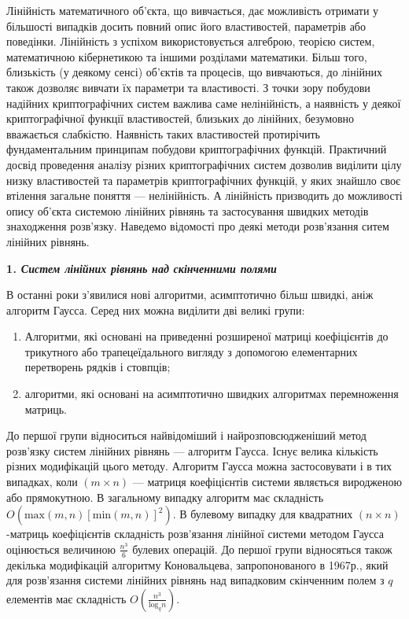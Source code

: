 \bigskip


\bigskip

Лінійність математичного об’єкта, що вивчається, дає можливість отримати у
більшості випадків досить повний опис його властивостей, параметрів або
поведінки. Лінійність з успіхом використовується алгеброю, теорією систем,
математичною кібернетикою та іншими розділами математики. Більш того,
близькість (у деякому сенсі)  об’єктів та процесів, що вивчаються, до лінійних
також дозволяє вивчати їх параметри та властивості. З точки зору побудови
надійних криптографічних систем важлива саме нелінійність, а наявність у деякої
криптографічної функції властивостей, близьких до лінійних, безумовно
вважається слабкістю. Наявність таких властивостей протирічить фундаментальним
принципам побудови криптографічних функцій. Практичний досвід проведення
аналізу різних криптографічних систем дозволив виділити цілу низку властивостей
та параметрів криптографічних функцій, у яких знайшло своє втілення загальне
поняття --- нелінійність. А лінійність призводить до можливості опису об’єкта
системою лінійних рівнянь та застосування швидких методів знаходження
розв’язку. Наведемо відомості про деякі методи розв’язання ситем лінійних
рівнянь.


\bigskip

{\bfseries
1\textit{. Систем лінійних рівнянь над скінченними полями}}

 В останні роки з’явилися нові алгоритми, асимптотично більш швидкі, аніж
алгоритм Гаусса. Серед них можна виділити дві великі групи:

\liststyleWWviiiNumxxiii
\begin{enumerate}
\item Алгоритми, які основані на приведенні розширеної матриці коефіцієнтів до
трикутного або трапецеїдального вигляду з допомогою елементарних перетворень
рядків і стовпців;
\item алгоритми, які основані на асимптотично швидких алгоритмах перемноження
матриць.
\end{enumerate}
До першої групи відноситься найвідоміший і найрозповсюдженіший метод розв’язку
систем лінійних рівнянь --- алгоритм Гаусса. Існує велика кількість різних
модифікацій цього методу. Алгоритм Гаусса можна застосовувати і в тих випадках,
коли  ${(m\times n)}$ --- матриця коефіцієнтів системи являється виродженою або
прямокутною. В загальному випадку алгоритм має складність 
${O(\text{max}(m,n)[\text{min}(m,n)]^{{2}})}$. В булевому випадку для
квадратних  ${(n\times n)}${}-матриць коефіцієнтів складність розв’язання
лінійної системи методом Гаусса оцінюється величиною  ${\frac{n^{{3}}}{6}}$
булевих операцій. До першої групи відносяться також декілька модифікацій
алгоритму Коновальцева, запропонованого в 1967р., який для розв’язання системи
лінійних рівнянь над випадковим скінченним полем з  ${q}$ елементів має
складність  ${O\left(\frac{n^{{3}}}{\text{log}_{{q}}n}\right)}$.

